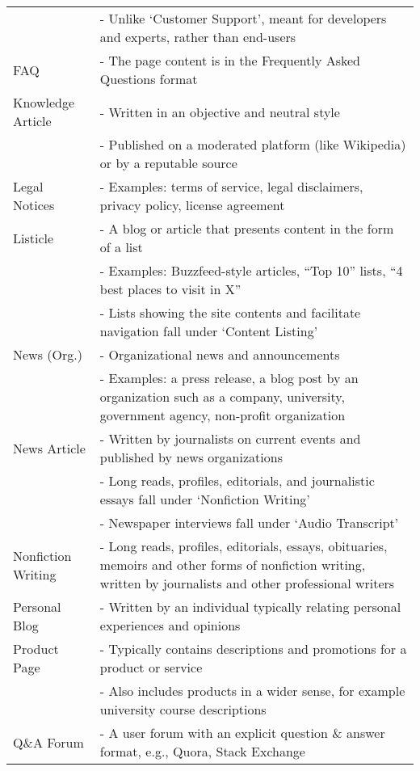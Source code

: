 \begin{table}[!ht]
\begin{tabular}{l@{\hspace{8pt}}p{}}
            & - Unlike `Customer Support', meant for developers and experts, rather than end-users \\
\addlinespace[0.05in]
FAQ & - The page content is in the Frequently Asked Questions format \\
\addlinespace[0.05in]
Knowledge Article & - Written in an objective and neutral style \\
            & - Published on a moderated platform (like Wikipedia) or by a reputable source \\
\addlinespace[0.05in]
Legal Notices & - Examples: terms of service, legal disclaimers, privacy policy, license agreement \\
\addlinespace[0.05in]
Listicle & - A blog or article that presents content in the form of a list \\
            & - Examples: Buzzfeed-style articles, ``Top 10'' lists, ``4 best places to visit in X'' \\
            & - Lists showing the site contents and facilitate navigation fall under `Content Listing' \\
\addlinespace[0.05in]
News (Org.) & - Organizational news and announcements \\
        & - Examples: a press release, a blog post by an organization such as a company, university, government agency, non-profit organization \\
\addlinespace[0.05in]
News Article & - Written by journalists on current events and published by news organizations \\
            & - Long reads, profiles, editorials, and journalistic essays fall under `Nonfiction Writing' \\
            & - Newspaper interviews fall under `Audio Transcript' \\
\addlinespace[0.05in]
Nonfiction Writing & - Long reads, profiles, editorials, essays, obituaries, memoirs and other forms of nonfiction writing, written by journalists and other professional writers \\
\addlinespace[0.05in]
Personal Blog & - Written by an individual typically relating personal experiences and opinions \\
\addlinespace[0.05in]
Product Page & - Typically contains descriptions and promotions for a product or service \\
            & - Also includes products in a wider sense, for example university course descriptions \\
\addlinespace[0.05in]
Q\&A Forum & - A user forum with an explicit question \& answer format, e.g., Quora, Stack Exchange \\

\end{tabular}
\end{table}
